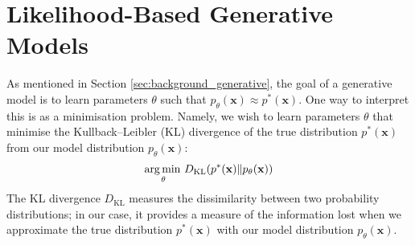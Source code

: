 \documentclass[ oneside,%
                    author={George Herbert},
                    degree={MSci},
                     title={Diffusion Models for Time-Evolving Precipitation Fields},
                  subtitle={}]{dissertation}
\begin{document}
\section{Likelihood-Based Generative Models}
\label{sec:background_unbiased_objective}

As mentioned in Section \ref{sec:background_generative}, the goal of a generative model is to learn parameters $\theta$ such that $p_\theta(\mathbf{x})\approx p^*(\mathbf{x})$. One way to interpret this is as a minimisation problem. Namely, we wish to learn parameters $\theta$ that minimise the Kullback--Leibler (KL) divergence of the true distribution $p^*(\mathbf{x})$ from our model distribution $p_\theta(\mathbf{x})$:
\begin{align}
      \operatorname*{arg\,min\,}_\theta D_{\mathrm{KL}}(p^*(\mathbf{x})\Vert p_\theta(\mathbf{x}))
\end{align}
The KL divergence $D_{\mathrm{KL}}$ measures the dissimilarity between two probability distributions; in our case, it provides a measure of the information lost when we approximate the true distribution $p^*(\mathbf{x})$ with our model distribution $p_\theta(\mathbf{x})$.
\end{document}
